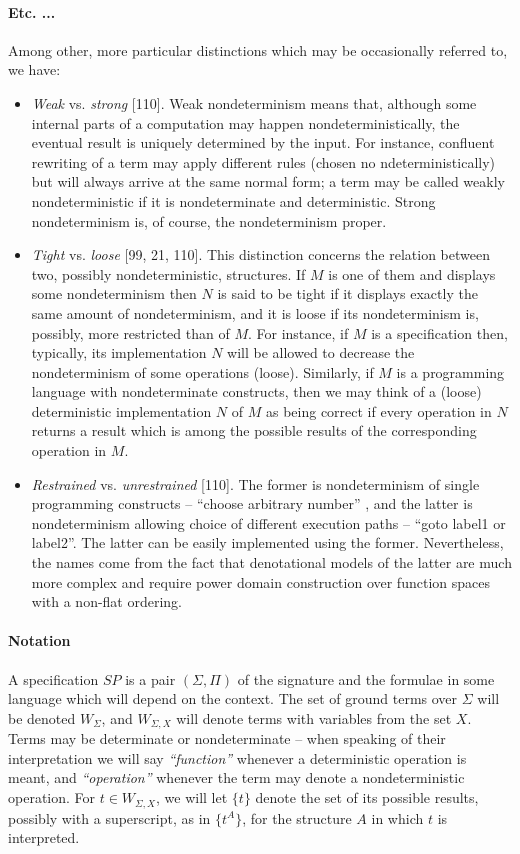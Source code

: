 \documentclass[10pt]{article}
\newcommand{\GTerms}{W_{\Sigma}}
\newcommand{\XTerms}{W_{\Sigma,X}}
\begin{document}
\paragraph*{Etc. ...} 
Among other, more particular 
distinctions which may be occasionally referred to, we have:
\begin{itemize}
\item {\em Weak} vs. {\em strong} [110]. 
Weak nondeterminism means that, although some internal parts 
of a computation may happen nondeterministically, the eventual result 
is uniquely determined by the input. For instance, confluent 
rewriting of a term may apply different rules (chosen no
ndeterministically) but will always arrive at the same normal form; a 
term may be called weakly nondeterministic if it is nondeterminate 
and deterministic. Strong nondeterminism is, of course, the 
nondeterminism proper.
\item {\em Tight} vs. {\em loose} [99, 21, 110]. This distinction concerns the relation between two, possibly 
nondeterministic, structures. If $M$ is one of them and displays 
some nondeterminism then $N$
 is said to be tight if it displays exactly the same amount of 
nondeterminism, and it is loose if its nondeterminism is, possibly, 
more restricted than of $M$. For instance, if $M$ is a 
specification then, typically, its implementation $N$
 will be allowed to decrease the nondeterminism of some operations 
(loose). Similarly, if $M$ is a programming language with 
nondeterminate constructs, then we may think of a (loose) 
deterministic implementation $N$ of $M$
 as being correct if every operation in $N$ returns a result which 
is among the possible results of the corresponding operation in 
$M$.  
\item {\em Restrained} vs. {\em unrestrained }[110]. 
The former is nondeterminism of single programming constructs 
 -- ``choose arbitrary number'' , and the 
latter is nondeterminism allowing choice of different execution paths  -- ``goto label1 or 
label2''. The latter can be easily implemented using the former. 
Nevertheless, the names come from the fact that denotational models 
of the latter are much more complex and require power domain 
construction over function spaces with a non-flat ordering.  
\end{itemize}

\paragraph*{Notation}
 A specification $SP$ is a pair $(\Sigma,\Pi)$ of the 
signature and the formulae in some language which will depend on the 
context. The set of ground terms over $\Sigma$
 will be denoted $\GTerms$, and $\XTerms$ will denote terms with 
 variables from the set $X$. Terms may be determinate or nondeterminate 
 -- when speaking of their interpretation we will say {\em 
``function'' } whenever a deterministic operation is 
meant, and {\em ``operation''} whenever the term may 
denote a nondeterministic operation. For $t\in\XTerms$, we will 
let $\{t\}$ denote the set 
of its possible results, possibly with a superscript, as in 
$\{t^{A}\}$,  for the structure $A$ in which $t$
 is interpreted. 
\end{document}
